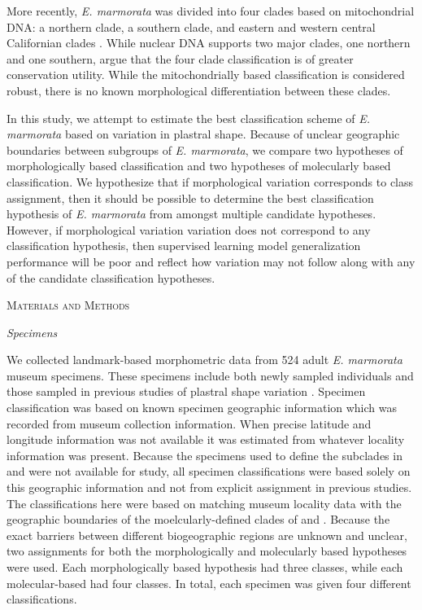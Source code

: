 \documentclass[12pt,letterpaper]{article}\usepackage{graphicx, color}
\renewcommand{\section}[1]{%
\bigskip
\begin{center}
\begin{Large}
\normalfont\scshape #1
\medskip
\end{Large}
\end{center}}
\renewcommand{\subsection}[1]{%
\bigskip
\begin{center}
\begin{large}
\normalfont\itshape #1
\end{large}
\end{center}}
\begin{document}
More recently, \textit{E. marmorata} was divided into four clades based on mitochondrial DNA: a northern clade, a southern clade, and eastern and western central Californian clades \citep{Spinks2005,Spinks2010}. While nuclear DNA supports two major clades, one northern and one southern, \citet{Spinks2010} argue that the four clade classification is of greater conservation utility. 
While the mitochondrially based classification is considered robust, there is no known morphological differentiation between these clades.

In this study, we attempt to estimate the best classification scheme of \textit{E. marmorata} based on variation in plastral shape. Because of unclear geographic boundaries between subgroups of \textit{E. marmorata}, we compare two hypotheses of morphologically based classification and two hypotheses of molecularly based classification. We hypothesize that if morphological variation corresponds to class assignment, then it should be possible to determine the best classification hypothesis of \textit{E. marmorata} from amongst multiple candidate hypotheses. However, if morphological variation variation does not correspond to any classification hypothesis, then supervised learning model generalization performance will be poor and reflect how variation may not follow along with any of the candidate classification hypotheses.

\section{Materials and Methods}
\subsection{Specimens}
We collected landmark-based morphometric data from 524 adult \textit{E. marmorata} museum specimens. These specimens include both newly sampled individuals and those sampled in previous studies of plastral shape variation \citep{Angielczyk2007,Angielczyk2011,Angielczyk2013a}. 
Specimen classification was based on known specimen geographic information which was recorded from museum collection information. When precise latitude and longitude information was not available it was estimated from whatever locality information was present. Because the specimens used to define the subclades in \citet{Spinks2005} and \citet{Spinks2010} were not available for study, all specimen classifications were based solely on this geographic information and not from explicit assignment in previous studies. The classifications here were based on matching museum locality data with the geographic boundaries of the moelcularly-defined clades of \citet{Spinks2005} and \citet{Spinks2010}. Because the exact barriers between different biogeographic regions are unknown and unclear, two assignments for both the morphologically and molecularly based hypotheses were used. Each morphologically based hypothesis had three classes, while each molecular-based had four classes. In total, each specimen was given four different classifications. 
\end{document}
